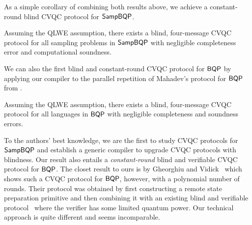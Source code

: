 As a simple corollary of combining both results above, we achieve a constant-round blind CVQC protocol for $\operatorname{\mathsf{SampBQP}}$. %
\begin{theorem}[informal]
		Assuming the QLWE assumption, there exists a blind, four-message CVQC protocol for all sampling problems in $\operatorname{\mathsf{SampBQP}}$ with negligible completeness error and computational soundness.
\end{theorem}

We can also the first blind and constant-round CVQC protocol for $\operatorname{\mathsf{BQP}}$ by applying our compiler to the parallel repetition of Mahadev's protocol for $\operatorname{\mathsf{BQP}}$ from \cite{parallelrep, alagic2019twomessage}.


\begin{theorem}[informal]
	Assuming the QLWE assumption, there exists a blind, four-message CVQC protocol for all languages in $\operatorname{\mathsf{BQP}}$ with negligible completeness and soundness errors.
\end{theorem}




To the authors' best knowledge, we are the first to study CVQC protocols for $\operatorname{\mathsf{SampBQP}}$ and establish a generic compiler to upgrade CVQC protocols with blindness. 
Our result also entails a \emph{constant-round} blind and verifiable CVQC protocol for $\operatorname{\mathsf{BQP}}$. 
The closet result to ours is by Gheorghiu and Vidick~\cite{FOCS:GheVid19} which shows such a CVQC protocol for $\operatorname{\mathsf{BQP}}$, however, with a polynomial number of rounds. 
Their protocol was obtained by first constructing a remote state preparation primitive and then combining it with an existing blind and verifiable protocol~\cite{FK17} where the verifier has some limited quantum power. 
Our technical approach is quite different and seems incomparable. 


